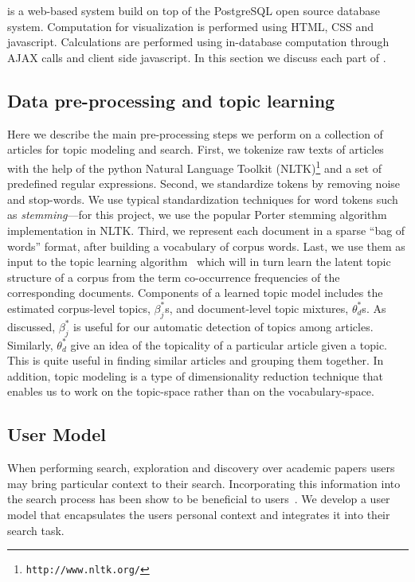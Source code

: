 \section{\system}



\system is a web-based system build on top of the PostgreSQL open 
source database system. Computation for visualization is performed
using HTML, CSS and javascript. Calculations are performed using 
in-database computation through AJAX calls and client side 
javascript. In this section we discuss each part of \system. 

\subsection{Data pre-processing and topic learning}

Here we describe the main pre-processing steps we perform on a 
collection of articles for topic modeling and search. First, 
we tokenize raw texts of articles with the help of the python 
Natural Language Toolkit 
(NLTK)\footnote{\texttt{http://www.nltk.org/}} and a set of 
predefined regular expressions. Second, we standardize tokens by 
removing noise and stop-words. We use typical standardization 
techniques for word tokens such as \textsl{stemming}---for this 
project, we use the popular Porter stemming algorithm 
\cite{Porter1980} implementation in NLTK. Third, we represent each 
document in a sparse ``bag of words'' format, after building a 
vocabulary of corpus words. Last, we use them as input to the topic 
learning algorithm~\cite{hoffman2010online} which will in turn learn 
the latent topic structure of a corpus from the term co-occurrence 
frequencies of the corresponding documents. Components of a learned 
topic model includes the estimated corpus-level topics, $\beta_j^{*}$s, 
and document-level topic mixtures, $\theta_d^{*}$s. As discussed, 
$\beta_j^{*}$ is useful for our automatic detection of topics among  
articles. Similarly, $\theta_d^{*}$ give an idea of the topicality 
of a particular article given a topic. This is quite useful in 
finding similar articles and grouping them together. In addition, 
topic modeling is a type of dimensionality reduction technique that 
enables us to work on the topic-space rather than on the 
vocabulary-space.



\subsection{User Model}
When performing search, exploration and discovery over academic papers users 
may bring particular context to their search. Incorporating this information
into the search process has been show to be beneficial to 
users~\cite{DZSRWJ,MZPGSOL}.
We develop a user model that 
encapsulates the users personal context and integrates it into their
search task. 

